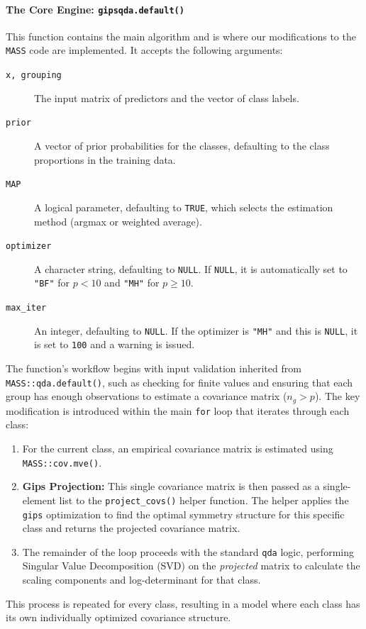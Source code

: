 \documentclass[a4paper,11pt,twoside]{report}
\theoremstyle{definition}
\begin{document}
\paragraph{The Core Engine: \texttt{gipsqda.default()}}
This function contains the main algorithm and is where our modifications to the \texttt{MASS} code are implemented. It accepts the following arguments:
\begin{description}
    \item[\texttt{x, grouping}] The input matrix of predictors and the vector of class labels.
    \item[\texttt{prior}] A vector of prior probabilities for the classes, defaulting to the class proportions in the training data.
    \item[\texttt{MAP}] A logical parameter, defaulting to \texttt{TRUE}, which selects the estimation method (argmax or weighted average).
    \item[\texttt{optimizer}] A character string, defaulting to \texttt{NULL}. If \texttt{NULL}, it is automatically set to \texttt{"BF"} for $p < 10$ and \texttt{"MH"} for $p \ge 10$.
    \item[\texttt{max\_iter}] An integer, defaulting to \texttt{NULL}. If the optimizer is \texttt{"MH"} and this is \texttt{NULL}, it is set to \texttt{100} and a warning is issued.
\end{description}

The function's workflow begins with input validation inherited from \texttt{MASS::qda.default()}, such as checking for finite values and ensuring that each group has enough observations to estimate a covariance matrix ($n_g > p$). The key modification is introduced within the main \texttt{for} loop that iterates through each class:
\begin{enumerate}
    \item For the current class, an empirical covariance matrix is estimated using \texttt{MASS::cov.mve()}.
    \item \textbf{Gips Projection:} This single covariance matrix is then passed as a single-element list to the \texttt{project\_covs()} helper function. The helper applies the \texttt{gips} optimization to find the optimal symmetry structure for this specific class and returns the projected covariance matrix.
    \item The remainder of the loop proceeds with the standard \texttt{qda} logic, performing Singular Value Decomposition (SVD) on the \textit{projected} matrix to calculate the scaling components and log-determinant for that class.
\end{enumerate}
This process is repeated for every class, resulting in a model where each class has its own individually optimized covariance structure.
\end{document}
